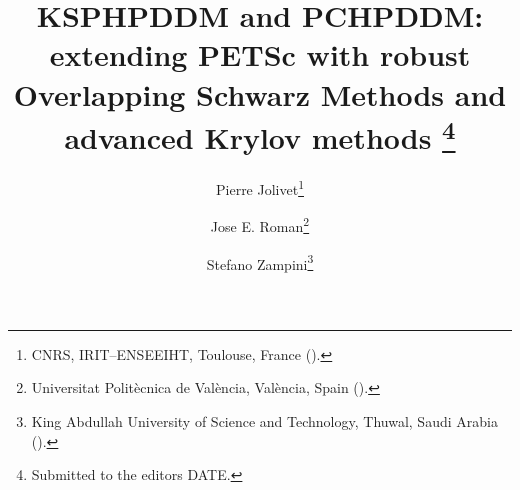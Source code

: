 

\usepackage{lipsum}
\usepackage{amsfonts}
\usepackage{graphicx}
\usepackage{epstopdf}
\usepackage{algorithmic}
\ifpdf
\else
\fi

\newcommand{\creflastconjunction}{, and~}



\title{KSPHPDDM and PCHPDDM: extending PETS\MakeLowercase{c} with robust Overlapping Schwarz Methods and advanced Krylov methods
\thanks{Submitted to the editors DATE.
}}

\author{Pierre Jolivet\thanks{CNRS, IRIT--ENSEEIHT, Toulouse, France 
  ().}
\and Jose E. Roman\thanks{Universitat Polit\`ecnica de Val\`encia, Val\`encia, Spain
  ().}
\and Stefano Zampini\thanks{King Abdullah University of Science and Technology, Thuwal, Saudi Arabia 
  ().}}

\usepackage{amsopn}
\DeclareMathOperator{\diag}{diag}


